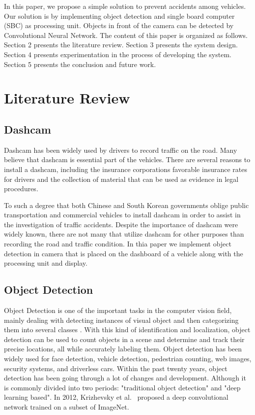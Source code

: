 \documentclass[conference]{IEEEtran}
\begin{document}
In this paper, we propose a simple solution to prevent accidents among vehicles. Our solution is by implementing object detection and single board computer (SBC) as processing unit. Objects in front of the camera can be detected by Convolutional Neural Network. 
The content of this paper is organized as follows. Section 2 presents the literature review. Section 3 presents the system design. Section 4 presents experimentation in the process of developing the system. Section 5 presents the conclusion and future work.

\section{Literature Review}
\subsection{Dashcam}
Dashcam has been widely used by drivers to record traffic on the road. Many believe that dashcam is essential part of the vehicles.
There are several reasons to install a dashcam, including the insurance corporations favorable insurance rates for drivers and the collection of material that can be used as evidence in legal procedures. 

To such a degree that both Chinese and South Korean governments oblige public transportation and commercial vehicles to install dashcam in order to assist in the investigation of traffic accidents\cite{Korea Dashcam}.
Despite the importance of dashcam were widely known, there are not many that utilize dashcam for other purposes than recording the road and traffic condition. In thia paper we implement object detection in camera that is placed on the dashboard of a vehicle along with the processing unit and display.
\subsection{Object Detection}
Object Detection is one of the important tasks in the computer vision field, mainly dealing with detecting instances of visual object and then categorizing them into several classes \cite{b2}.
With this kind of identification and localization, object detection can be used to count objects in a scene and determine and track their precise locations, all while accurately labeling them.
Object detection has been widely used for face detection, vehicle detection, pedestrian counting, web images, security systems, and driverless cars.
Within the past twenty years, object detection has been going through a lot of changes and development. Although it is commonly divided into two periods: "traditional object detection" and "deep learning based".
In 2012, Krizhevsky et al.~\cite{b3} proposed a deep convolutional network trained on a subset of ImageNet. 
\end{document}
